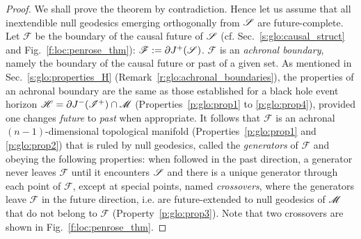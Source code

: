 \begin{proof}
We shall prove the theorem by contradiction. Hence let us assume that all
inextendible null geodesics emerging orthogonally from $\mathscr{S}$ are future-complete. Let $\mathscr{F}$
be the boundary of the causal future of $\mathscr{S}$
(cf. Sec.~\ref{s:glo:causal_struct} and Fig.~\ref{f:loc:penrose_thm}): $\mathscr{F} := \partial J^+(\mathscr{S})$.
$\mathscr{F}$ is an \emph{achronal boundary},
namely the boundary of the causal future or past of a given set.
As mentioned in Sec.~\ref{s:glo:properties_H} (Remark~\ref{r:glo:achronal_boundaries}),
the properties of an achronal boundary are the same as those established for a black hole event horizon
$\mathscr{H} = \partial J^-(\mathscr{I}^+) \cap \mathscr{M}$ (Properties~\ref{p:glo:prop1} to \ref{p:glo:prop4}),
provided one changes \emph{future} to \emph{past} when appropriate.
It follows that $\mathscr{F}$ is an achronal $(n-1)$-dimensional topological manifold
(Properties~\ref{p:glo:prop1} and \ref{p:glo:prop2}) that is ruled by null geodesics,
called the \emph{generators} of $\mathscr{F}$ and
obeying the following properties:
when followed in the past direction, a generator never leaves $\mathscr{F}$ until it encounters $\mathscr{S}$
and there is a unique generator through each point of $\mathscr{F}$, except at special
points, named \emph{crossovers}, where the generators leave
$\mathscr{F}$ in the future direction,
i.e. are future-extended to null geodesics of $\mathscr{M}$ that do not belong
to $\mathscr{F}$ (Property~\ref{p:glo:prop3}). Note that two crossovers are shown in
Fig.~\ref{f:loc:penrose_thm}.


\end{proof}
